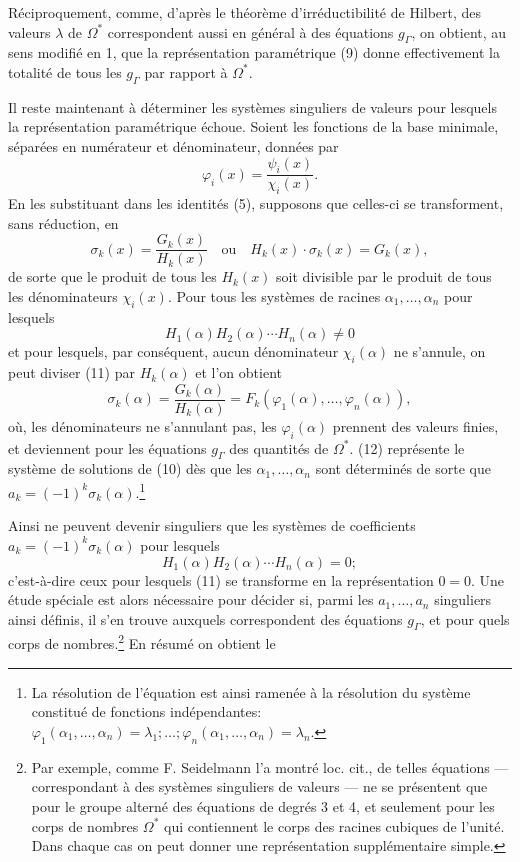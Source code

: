 Réciproquement, comme, d'après le théorème d'irréductibilité de Hilbert, des valeurs $\lambda$ de $\Omega^*$ correspondent aussi \og{}en général\fg{} à des équations $g_\Gamma$, on obtient, au sens modifié en 1, que la représentation paramétrique (9) donne effectivement la totalité de tous les $g_\Gamma$ par rapport à $\Omega^*$.

Il reste maintenant à déterminer les systèmes singuliers de valeurs pour lesquels la représentation paramétrique échoue. Soient les fonctions de la base minimale, séparées en numérateur et dénominateur, données par
\[
\varphi_i(x)=\frac{\psi_i(x)}{\chi_i(x)}.
\]
En les substituant dans les identités (5), supposons que celles-ci se transforment, sans réduction, en
\begin{equation}\tag{11}
\sigma_k(x)=\frac{G_k(x)}{H_k(x)}\quad\text{ou}\quad H_k(x)\cdot\sigma_k(x)=G_k(x),
\end{equation}
de sorte que le produit de tous les $H_k(x)$ soit divisible par le produit de tous les dénominateurs $\chi_i(x)$. Pour tous les systèmes de racines $\alpha_1,
\ldots,\alpha_n$ pour lesquels
\[
H_1(\alpha)H_2(\alpha)\cdots H_n(\alpha)\ne0
\]
et pour lesquels, par conséquent, aucun dénominateur $\chi_i(\alpha)$ ne s'annule, on peut diviser (11) par $H_k(\alpha)$ et l'on obtient
\begin{equation}\tag{12}
\sigma_k(\alpha)=\frac{G_k(\alpha)}{H_k(\alpha)}=F_k(\varphi_1(\alpha),\ldots,\varphi_n(\alpha)),
\end{equation}
où, les dénominateurs ne s'annulant pas, les $\varphi_i(\alpha)$ prennent des valeurs finies, et deviennent pour les équations $g_\Gamma$ des quantités de $\Omega^*$. (12) représente le système de solutions de (10) dès que les $\alpha_1,
\ldots,\alpha_n$ sont déterminés de sorte que $a_k=(-1)^k\sigma_k(\alpha)$.\footnote{La résolution de l'équation est ainsi ramenée à la résolution du système constitué de fonctions indépendantes:
$\varphi_1(\alpha_1,
\ldots,\alpha_n)=\lambda_1;\ldots;\varphi_n(\alpha_1,
\ldots,\alpha_n)=\lambda_n$.}

Ainsi ne peuvent devenir singuliers que les systèmes de coefficients $a_k=(-1)^k\sigma_k(\alpha)$ pour lesquels
\[
H_1(\alpha)H_2(\alpha)\cdots H_n(\alpha)=0;
\]
c'est-à-dire ceux pour lesquels (11) se transforme en la représentation $0=0$. Une étude spéciale est alors nécessaire pour décider si, parmi les $a_1,
\ldots,a_n$ singuliers ainsi définis, il s'en trouve auxquels correspondent des équations $g_\Gamma$, et pour quels corps de nombres.\footnote{Par exemple, comme F. Seidelmann l'a montré loc. cit., de telles équations --- correspondant à des systèmes singuliers de valeurs --- ne se présentent que pour le groupe alterné des équations de degrés 3 et 4, et seulement pour les corps de nombres $\Omega^*$ qui contiennent le corps des racines cubiques de l'unité. Dans chaque cas on peut donner une représentation supplémentaire simple.} En résumé on obtient le

